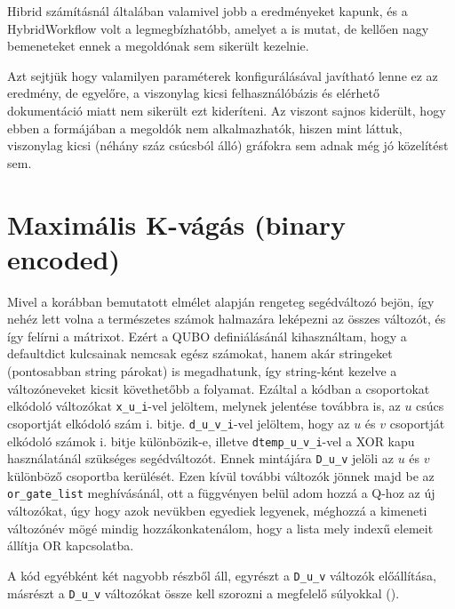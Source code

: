 Hibrid számításnál általában valamivel jobb a eredményeket kapunk, és a HybridWorkflow volt a legmegbízhatóbb, amelyet a  is mutat, de kellően nagy bemeneteket ennek a megoldónak sem sikerült kezelnie.

Azt sejtjük hogy valamilyen paraméterek konfigurálásával javítható lenne ez az eredmény, de egyelőre, a viszonylag kicsi felhasználóbázis és elérhető dokumentáció miatt nem sikerült ezt kideríteni. Az viszont sajnos kiderült, hogy ebben a formájában a megoldók nem alkalmazhatók, hiszen mint láttuk, viszonylag kicsi (néhány száz csúcsból álló) gráfokra sem adnak még jó közelítést sem.

\section{Maximális K-vágás (binary encoded)}\label{sec:practiceBinary}

Mivel a korábban bemutatott elmélet alapján rengeteg segédváltozó bejön, így nehéz lett volna a természetes számok halmazára leképezni az összes változót, és így felírni a mátrixot. Ezért a QUBO definiálásánál kihasználtam, hogy a defaultdict kulcsainak nemcsak egész számokat, hanem akár stringeket (pontosabban string párokat) is megadhatunk, így string-ként kezelve a változóneveket kicsit követhetőbb a folyamat. Ezáltal a kódban a csoportokat elkódoló változókat \verb+x_u_i+-vel jelöltem, melynek jelentése továbbra is, az $u$ csúcs csoportját elkódoló szám i. bitje. \verb+d_u_v_i+-vel jelöltem, hogy az $u$ és $v$ csoportját elkódoló számok i. bitje különbözik-e, illetve \verb+dtemp_u_v_i+-vel a XOR kapu használatánál szükséges segédváltozót. Ennek mintájára \verb+D_u_v+ jelöli az $u$ és $v$ különböző csoportba kerülését. Ezen kívül további változók jönnek majd be az \verb+or_gate_list+ meghívásánál, ott a függvényen belül adom hozzá a Q-hoz az új változókat, úgy hogy azok nevükben egyediek legyenek, méghozzá a kimeneti változónév mögé mindig hozzákonkatenálom, hogy a lista mely indexű elemeit állítja OR kapcsolatba.

A kód egyébként két nagyobb részből áll, egyrészt a \verb+D_u_v+ változók előállítása, másrészt a  \verb+D_u_v+ változókat össze kell szorozni a megfelelő súlyokkal ().

